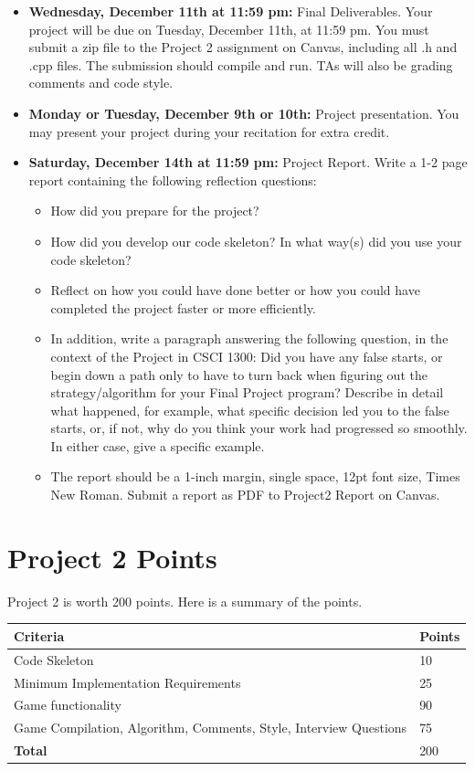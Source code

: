 \begin{itemize}
    \item \textbf{Wednesday, December 11th at 11:59 pm:} Final Deliverables. Your project will be due on Tuesday, December 11th, at 11:59 pm. You must submit a zip file to the Project 2 assignment on Canvas, including all .h and .cpp files. The submission should compile and run. TAs will also be grading comments and code style.
    \item \textbf{Monday or Tuesday, December 9th or 10th: } Project presentation. You may present your project during your recitation for extra credit.%
    \item \textbf{Saturday, December 14th at 11:59 pm:} Project Report. Write a 1-2 page report containing the following reflection questions:
    \begin{itemize}
        \item How did you prepare for the project?
        \item How did you develop our code skeleton? In what way(s) did you use your code skeleton?
        \item Reflect on how you could have done better or how you could have completed the project faster or more efficiently.
        \item In addition, write a paragraph answering the following question, in the context of the Project in CSCI 1300: Did you have any false starts, or begin down a path only to have to turn back when figuring out the strategy/algorithm for your Final Project program? Describe in detail what happened, for example, what specific decision led you to the false starts, or, if not, why do you think your work had progressed so smoothly. In either case, give a specific example.
        \item The report should be a 1-inch margin, single space, 12pt font size, Times New Roman. Submit a report as PDF to Project2 Report on Canvas.
    \end{itemize}
\end{itemize}
 
\section{Project 2 Points}
Project 2 is worth 200 points. Here is a summary of the points.

\begin{table}[H]
\centering

\begin{tabular}{|l |l|} \hline 
\textbf{Criteria}& \textbf{Points}\\ \hline 

Code Skeleton & 10 \\ \hline 
Minimum Implementation Requirements & 25\\ \hline 
Game functionality & 90\\ \hline 
Game Compilation, Algorithm, Comments, Style, Interview Questions & 75 \\ \hline 
\textbf{Total}& 200\\ \hline

\end{tabular}

\end{table}


